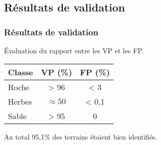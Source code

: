 \subsection{Résultats de validation}
    \begin{frame}
        \frametitle{Résultats de validation}
        Évaluation du rapport entre les VP et les FP.
        \begin{center}              
            \begin{tabular}{|lcc|}
                \hline
                Classe & VP (\%) &  FP (\%)\\
                \hline
                Roche & > 96 & < 3 \\
                Herbes & $\approx 50$ & < 0,1 \\
                Sable & > 95 & 0\\
                \hline           
            \end{tabular}                  
        \end{center}
        Au total 95,1\% des terrains étaient bien identifiés. 
    \end{frame}

            
